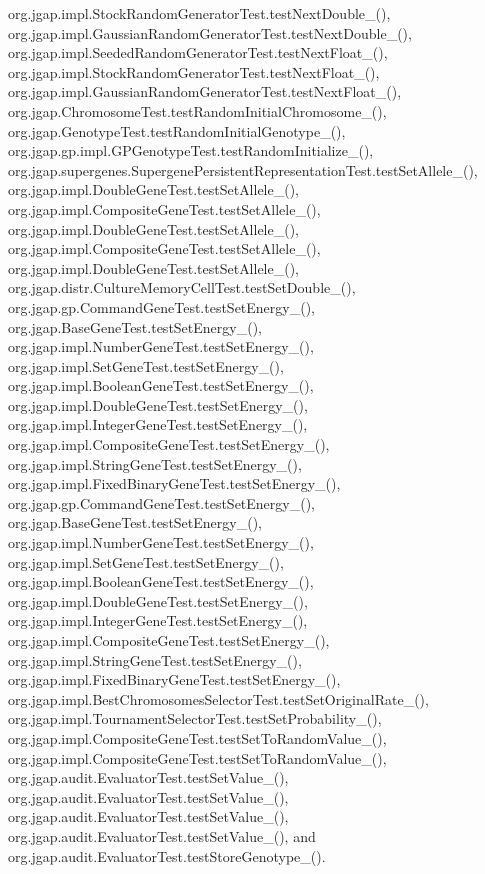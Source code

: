org.\-jgap.\-impl.\-Stock\-Random\-Generator\-Test.\-test\-Next\-Double\-\_(), org.\-jgap.\-impl.\-Gaussian\-Random\-Generator\-Test.\-test\-Next\-Double\-\_(), org.\-jgap.\-impl.\-Seeded\-Random\-Generator\-Test.\-test\-Next\-Float\-\_(), org.\-jgap.\-impl.\-Stock\-Random\-Generator\-Test.\-test\-Next\-Float\-\_(), org.\-jgap.\-impl.\-Gaussian\-Random\-Generator\-Test.\-test\-Next\-Float\-\_(), org.\-jgap.\-Chromosome\-Test.\-test\-Random\-Initial\-Chromosome\-\_(), org.\-jgap.\-Genotype\-Test.\-test\-Random\-Initial\-Genotype\-\_(), org.\-jgap.\-gp.\-impl.\-G\-P\-Genotype\-Test.\-test\-Random\-Initialize\-\_(), org.\-jgap.\-supergenes.\-Supergene\-Persistent\-Representation\-Test.\-test\-Set\-Allele\-\_(), org.\-jgap.\-impl.\-Double\-Gene\-Test.\-test\-Set\-Allele\-\_(), org.\-jgap.\-impl.\-Composite\-Gene\-Test.\-test\-Set\-Allele\-\_(), org.\-jgap.\-impl.\-Double\-Gene\-Test.\-test\-Set\-Allele\-\_(), org.\-jgap.\-impl.\-Composite\-Gene\-Test.\-test\-Set\-Allele\-\_(), org.\-jgap.\-impl.\-Double\-Gene\-Test.\-test\-Set\-Allele\-\_(), org.\-jgap.\-distr.\-Culture\-Memory\-Cell\-Test.\-test\-Set\-Double\-\_(), org.\-jgap.\-gp.\-Command\-Gene\-Test.\-test\-Set\-Energy\-\_(), org.\-jgap.\-Base\-Gene\-Test.\-test\-Set\-Energy\-\_(), org.\-jgap.\-impl.\-Number\-Gene\-Test.\-test\-Set\-Energy\-\_(), org.\-jgap.\-impl.\-Set\-Gene\-Test.\-test\-Set\-Energy\-\_(), org.\-jgap.\-impl.\-Boolean\-Gene\-Test.\-test\-Set\-Energy\-\_(), org.\-jgap.\-impl.\-Double\-Gene\-Test.\-test\-Set\-Energy\-\_(), org.\-jgap.\-impl.\-Integer\-Gene\-Test.\-test\-Set\-Energy\-\_(), org.\-jgap.\-impl.\-Composite\-Gene\-Test.\-test\-Set\-Energy\-\_(), org.\-jgap.\-impl.\-String\-Gene\-Test.\-test\-Set\-Energy\-\_(), org.\-jgap.\-impl.\-Fixed\-Binary\-Gene\-Test.\-test\-Set\-Energy\-\_(), org.\-jgap.\-gp.\-Command\-Gene\-Test.\-test\-Set\-Energy\-\_(), org.\-jgap.\-Base\-Gene\-Test.\-test\-Set\-Energy\-\_(), org.\-jgap.\-impl.\-Number\-Gene\-Test.\-test\-Set\-Energy\-\_(), org.\-jgap.\-impl.\-Set\-Gene\-Test.\-test\-Set\-Energy\-\_(), org.\-jgap.\-impl.\-Boolean\-Gene\-Test.\-test\-Set\-Energy\-\_(), org.\-jgap.\-impl.\-Double\-Gene\-Test.\-test\-Set\-Energy\-\_(), org.\-jgap.\-impl.\-Integer\-Gene\-Test.\-test\-Set\-Energy\-\_(), org.\-jgap.\-impl.\-Composite\-Gene\-Test.\-test\-Set\-Energy\-\_(), org.\-jgap.\-impl.\-String\-Gene\-Test.\-test\-Set\-Energy\-\_(), org.\-jgap.\-impl.\-Fixed\-Binary\-Gene\-Test.\-test\-Set\-Energy\-\_(), org.\-jgap.\-impl.\-Best\-Chromosomes\-Selector\-Test.\-test\-Set\-Original\-Rate\-\_(), org.\-jgap.\-impl.\-Tournament\-Selector\-Test.\-test\-Set\-Probability\-\_(), org.\-jgap.\-impl.\-Composite\-Gene\-Test.\-test\-Set\-To\-Random\-Value\-\_(), org.\-jgap.\-impl.\-Composite\-Gene\-Test.\-test\-Set\-To\-Random\-Value\-\_(), org.\-jgap.\-audit.\-Evaluator\-Test.\-test\-Set\-Value\-\_(), org.\-jgap.\-audit.\-Evaluator\-Test.\-test\-Set\-Value\-\_(), org.\-jgap.\-audit.\-Evaluator\-Test.\-test\-Set\-Value\-\_(), org.\-jgap.\-audit.\-Evaluator\-Test.\-test\-Set\-Value\-\_(), and org.\-jgap.\-audit.\-Evaluator\-Test.\-test\-Store\-Genotype\-\_().

